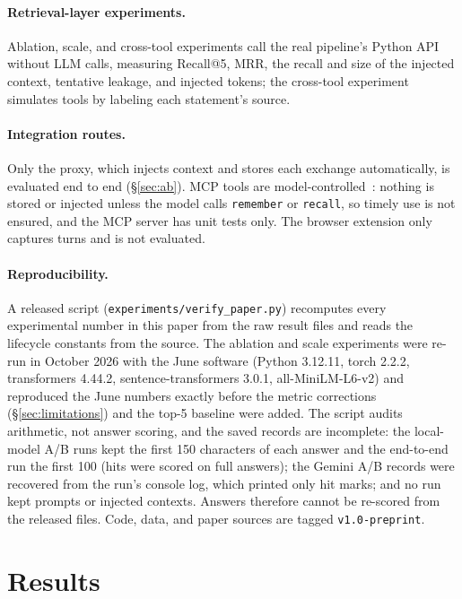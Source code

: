 \documentclass[11pt]{article}
\begin{document}
\paragraph{Retrieval-layer experiments.} Ablation, scale, and cross-tool
experiments call the real pipeline's Python API without LLM calls, measuring
Recall@5, MRR, the recall and size of the injected context, tentative leakage,
and injected tokens; the cross-tool experiment simulates tools by labeling
each statement's source.

\paragraph{Integration routes.} Only the proxy, which injects context and
stores each exchange automatically, is evaluated end to end (\S\ref{sec:ab}).
MCP tools are model-controlled~\citep{mcpspec}: nothing is stored or injected
unless the model calls \texttt{remember} or \texttt{recall}, so timely use is
not ensured, and the MCP server has unit tests only. The browser extension
only captures turns and is not evaluated.

\paragraph{Reproducibility.} A released script
(\texttt{experiments/verify\_paper.py}) recomputes every experimental number
in this paper from the raw result files and reads the lifecycle constants from
the source. The ablation and scale experiments were re-run in October 2026
with the June software (Python 3.12.11, torch 2.2.2, transformers 4.44.2,
sentence-transformers 3.0.1, all-MiniLM-L6-v2) and reproduced the June numbers
exactly before the metric corrections (\S\ref{sec:limitations}) and the top-5
baseline were added. The script audits arithmetic, not answer scoring, and the
saved records are incomplete: the local-model A/B runs kept the first 150
characters of each answer and the end-to-end run the first 100 (hits were
scored on full answers); the Gemini A/B records were recovered from the run's
console log, which printed only hit marks; and no run kept prompts or injected
contexts. Answers therefore cannot be re-scored from the released files. Code,
data, and paper sources are tagged \texttt{v1.0-preprint}.

\section{Results}
\label{sec:results}
\end{document}
